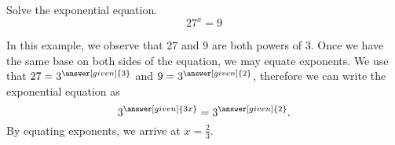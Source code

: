 \documentclass{ximera}
\begin{document}
 \begin{example}
Solve the exponential equation.
\[
27^x=9
\]
\end{example}
 \begin{explanation}
In this example, we observe that $27$ and $9$ are both powers of $3$.  Once we have the same base on both sides of the equation, we may equate exponents.
We use that $27=3^{\answer[given]{3}}$ and $9=3^{\answer[given]{2}}$, therefore we can write the exponential equation as 
 \[
3^{\answer[given]{3x}}=3^{\answer[given]{2}}.
\]
By equating exponents, we arrive at $x=\frac{2}{3}$.
\end{explanation}
 
 
\end{document}
